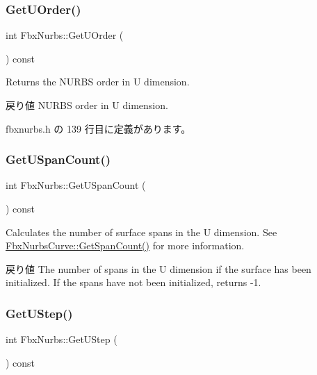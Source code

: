 \subsubsection{\texorpdfstring{Get\+U\+Order()}{GetUOrder()}}
{\footnotesize\ttfamily int Fbx\+Nurbs\+::\+Get\+U\+Order (\begin{DoxyParamCaption}{ }\end{DoxyParamCaption}) const\hspace{0.3cm}{\ttfamily [inline]}}

Returns the N\+U\+R\+BS order in U dimension. \begin{DoxyReturn}{戻り値}
N\+U\+R\+BS order in U dimension. 
\end{DoxyReturn}


 fbxnurbs.\+h の 139 行目に定義があります。

\mbox{\label{class_fbx_nurbs_aeac9fe4b1bd0deeb34854a968c852e0e}} 
\subsubsection{\texorpdfstring{Get\+U\+Span\+Count()}{GetUSpanCount()}}
{\footnotesize\ttfamily int Fbx\+Nurbs\+::\+Get\+U\+Span\+Count (\begin{DoxyParamCaption}{ }\end{DoxyParamCaption}) const}

Calculates the number of surface spans in the U dimension. See \hyperlink{class_fbx_nurbs_curve_acb1cf2016f20b2a0c8df382046c7d3ea}{Fbx\+Nurbs\+Curve\+::\+Get\+Span\+Count()} for more information. \begin{DoxyReturn}{戻り値}
The number of spans in the U dimension if the surface has been initialized. If the spans have not been initialized, returns -\/1. 
\end{DoxyReturn}
\mbox{\label{class_fbx_nurbs_a99382e737bd84391f67b00ed6866e1dd}} 
\subsubsection{\texorpdfstring{Get\+U\+Step()}{GetUStep()}}
{\footnotesize\ttfamily int Fbx\+Nurbs\+::\+Get\+U\+Step (\begin{DoxyParamCaption}{ }\end{DoxyParamCaption}) const\hspace{0.3cm}{\ttfamily [inline]}}

